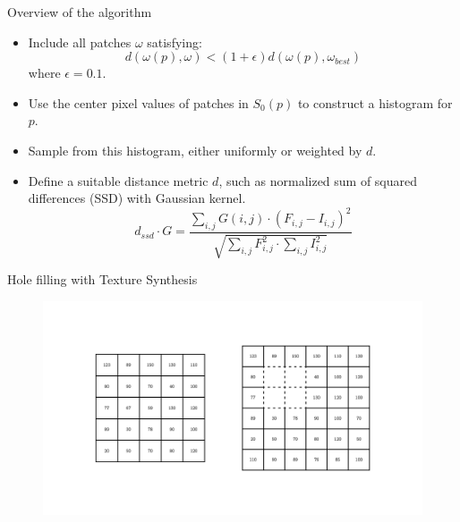 \documentclass{beamer}
\begin{document}
\begin{frame}{Overview of the algorithm}
    \begin{itemize}
         \item Include all patches \( \omega \) satisfying:
          \[
          d(\omega(p), \omega) < (1 + \epsilon) d(\omega(p), \omega_{best})
          \]
          where \( \epsilon = 0.1 \).
    \item Use the center pixel values of patches in \( S_0(p) \) to construct a histogram for \( p \).
    \item Sample from this histogram, either uniformly or weighted by \( d \).
    \item Define a suitable distance metric \( d \), such as normalized sum of squared differences (SSD) with Gaussian kernel.
    \[
    d_{ssd} \cdot G =  \frac{\sum_{i,j} G(i,j) \cdot (F_{i,j} - I_{i,j})^2}{\sqrt{\sum_{i,j} F_{i,j}^2 \cdot \sum_{i,j} I_{i,j}^2}}
    \]
    \end{itemize}
    
\end{frame}
\begin{frame}{Hole filling with Texture Synthesis}
    \begin{figure}[h]
        \centering
        \includegraphics[width=1\textwidth]{1.png}
        \captionsetup{labelformat=empty}
    \end{figure}
\end{frame}
\end{document}
